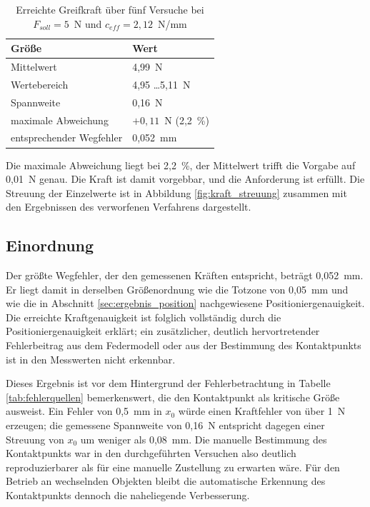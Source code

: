 \begin{table}[htbp]
    \centering
    \caption{Erreichte Greifkraft über fünf Versuche bei $F_{soll} = 5$~N und
             $c_{eff} = 2{,}12$~N/mm}
    \label{tab:kraftmessung}
    \begin{tabular}{ll}
        \hline
        Größe & Wert \\
        \hline
        Mittelwert                & 4,99~N \\
        Wertebereich              & 4,95 \ldots 5,11~N \\
        Spannweite                & 0,16~N \\
        maximale Abweichung       & $+0{,}11$~N \quad (2,2~\%) \\
        entsprechender Wegfehler  & 0,052~mm \\
        \hline
    \end{tabular}
\end{table}

Die maximale Abweichung liegt bei 2,2~\%, der Mittelwert trifft die Vorgabe auf 0,01~N
genau. Die Kraft ist damit vorgebbar, und die Anforderung ist erfüllt. Die Streuung der
Einzelwerte ist in Abbildung \ref{fig:kraft_streuung} zusammen mit den Ergebnissen des
verworfenen Verfahrens dargestellt.

\subsection*{Einordnung}

Der größte Wegfehler, der den gemessenen Kräften entspricht, beträgt 0,052~mm. Er liegt
damit in derselben Größenordnung wie die Totzone von 0,05~mm und wie die in Abschnitt
\ref{sec:ergebnis_position} nachgewiesene Positioniergenauigkeit. Die erreichte
Kraftgenauigkeit ist folglich vollständig durch die Positioniergenauigkeit erklärt; ein
zusätzlicher, deutlich hervortretender Fehlerbeitrag aus dem Federmodell oder aus der
Bestimmung des Kontaktpunkts ist in den Messwerten nicht erkennbar.

Dieses Ergebnis ist vor dem Hintergrund der Fehlerbetrachtung in Tabelle
\ref{tab:fehlerquellen} bemerkenswert, die den Kontaktpunkt als kritische Größe ausweist.
Ein Fehler von 0,5~mm in $x_0$ würde einen Kraftfehler von über 1~N erzeugen; die
gemessene Spannweite von 0,16~N entspricht dagegen einer Streuung von $x_0$ um weniger als
0,08~mm. Die manuelle Bestimmung des Kontaktpunkts war in den durchgeführten Versuchen
also deutlich reproduzierbarer als für eine manuelle Zustellung zu erwarten wäre. Für den
Betrieb an wechselnden Objekten bleibt die automatische Erkennung des Kontaktpunkts
dennoch die naheliegende Verbesserung.

